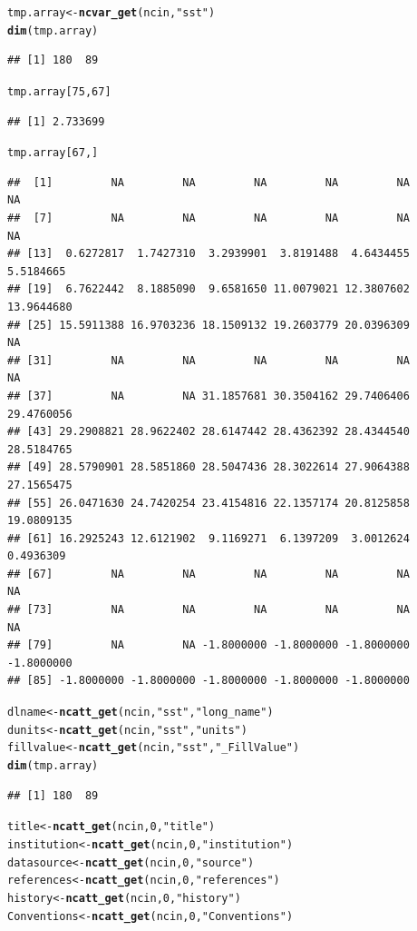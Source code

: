 \documentclass{article}\usepackage[]{graphicx}\usepackage[]{color}
\makeatletter
\newcommand{\hlnum}[1]{\textcolor[rgb]{0.686,0.059,0.569}{#1}}%
\newcommand{\hlstr}[1]{\textcolor[rgb]{0.192,0.494,0.8}{#1}}%
\newcommand{\hlstd}[1]{\textcolor[rgb]{0.345,0.345,0.345}{#1}}%
\newcommand{\hlkwb}[1]{\textcolor[rgb]{0.69,0.353,0.396}{#1}}%
\newcommand{\hlkwd}[1]{\textcolor[rgb]{0.737,0.353,0.396}{\textbf{#1}}}%
\newenvironment{kframe}{%
 \def\at@end@of@kframe{}%
 \ifinner\ifhmode%
  \def\at@end@of@kframe{\end{minipage}}%
  \begin{minipage}{\columnwidth}%
 \fi\fi%
 \def\FrameCommand##1{\hskip\@totalleftmargin \hskip-\fboxsep
 \colorbox{shadecolor}{##1}\hskip-\fboxsep
     \hskip-\linewidth \hskip-\@totalleftmargin \hskip\columnwidth}%
 \MakeFramed {\advance\hsize-\width
   \@totalleftmargin\z@ \linewidth\hsize
   \@setminipage}}%
 {\par\unskip\endMakeFramed%
 \at@end@of@kframe}
\newenvironment{knitrout}{}{} %
\makeatother
\begin{document}
\begin{knitrout}
\begin{kframe}
\begin{alltt}
\hlstd{tmp.array} \hlkwb{<-} \hlkwd{ncvar_get}\hlstd{(ncin,} \hlstr{"sst"}\hlstd{)}
\hlkwd{dim}\hlstd{(tmp.array)}
\end{alltt}
\begin{verbatim}
## [1] 180  89
\end{verbatim}
\begin{alltt}
\hlstd{tmp.array[}\hlnum{75}\hlstd{,} \hlnum{67}\hlstd{]}
\end{alltt}
\begin{verbatim}
## [1] 2.733699
\end{verbatim}
\begin{alltt}
\hlstd{tmp.array[}\hlnum{67}\hlstd{,]}
\end{alltt}
\begin{verbatim}
##  [1]         NA         NA         NA         NA         NA         NA
##  [7]         NA         NA         NA         NA         NA         NA
## [13]  0.6272817  1.7427310  3.2939901  3.8191488  4.6434455  5.5184665
## [19]  6.7622442  8.1885090  9.6581650 11.0079021 12.3807602 13.9644680
## [25] 15.5911388 16.9703236 18.1509132 19.2603779 20.0396309         NA
## [31]         NA         NA         NA         NA         NA         NA
## [37]         NA         NA 31.1857681 30.3504162 29.7406406 29.4760056
## [43] 29.2908821 28.9622402 28.6147442 28.4362392 28.4344540 28.5184765
## [49] 28.5790901 28.5851860 28.5047436 28.3022614 27.9064388 27.1565475
## [55] 26.0471630 24.7420254 23.4154816 22.1357174 20.8125858 19.0809135
## [61] 16.2925243 12.6121902  9.1169271  6.1397209  3.0012624  0.4936309
## [67]         NA         NA         NA         NA         NA         NA
## [73]         NA         NA         NA         NA         NA         NA
## [79]         NA         NA -1.8000000 -1.8000000 -1.8000000 -1.8000000
## [85] -1.8000000 -1.8000000 -1.8000000 -1.8000000 -1.8000000
\end{verbatim}
\begin{alltt}
\hlstd{dlname} \hlkwb{<-} \hlkwd{ncatt_get}\hlstd{(ncin,} \hlstr{"sst"}\hlstd{,} \hlstr{"long_name"}\hlstd{)}
\hlstd{dunits} \hlkwb{<-} \hlkwd{ncatt_get}\hlstd{(ncin,} \hlstr{"sst"}\hlstd{,} \hlstr{"units"}\hlstd{)}
\hlstd{fillvalue} \hlkwb{<-} \hlkwd{ncatt_get}\hlstd{(ncin,} \hlstr{"sst"}\hlstd{,} \hlstr{"_FillValue"}\hlstd{)}
\hlkwd{dim}\hlstd{(tmp.array)}
\end{alltt}
\begin{verbatim}
## [1] 180  89
\end{verbatim}
\begin{alltt}
\hlstd{title} \hlkwb{<-} \hlkwd{ncatt_get}\hlstd{(ncin,} \hlnum{0}\hlstd{,} \hlstr{"title"}\hlstd{)}
\hlstd{institution} \hlkwb{<-} \hlkwd{ncatt_get}\hlstd{(ncin,} \hlnum{0}\hlstd{,} \hlstr{"institution"}\hlstd{)}
\hlstd{datasource} \hlkwb{<-} \hlkwd{ncatt_get}\hlstd{(ncin,} \hlnum{0}\hlstd{,} \hlstr{"source"}\hlstd{)}
\hlstd{references} \hlkwb{<-} \hlkwd{ncatt_get}\hlstd{(ncin,} \hlnum{0}\hlstd{,} \hlstr{"references"}\hlstd{)}
\hlstd{history} \hlkwb{<-} \hlkwd{ncatt_get}\hlstd{(ncin,} \hlnum{0}\hlstd{,} \hlstr{"history"}\hlstd{)}
\hlstd{Conventions} \hlkwb{<-} \hlkwd{ncatt_get}\hlstd{(ncin,} \hlnum{0}\hlstd{,} \hlstr{"Conventions"}\hlstd{)}


\end{alltt}
\end{kframe}
\end{knitrout}
\end{document}
